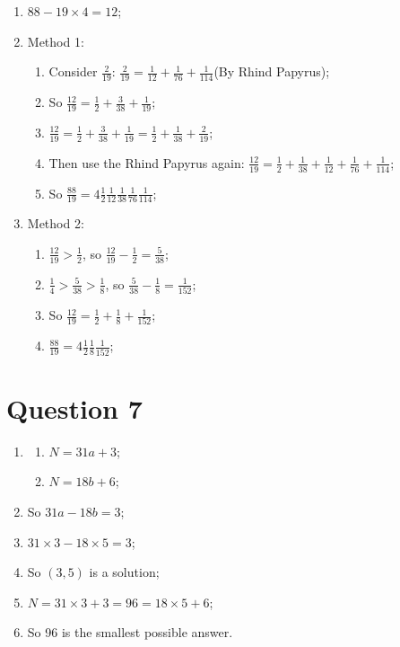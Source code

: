 \documentclass{article}
\begin{document}
\begin{enumerate}
    \item $88-19\times 4=12$;
    \item Method 1: \begin{enumerate}
        \item Consider $\frac{2}{19}$: $\frac{2}{19}=\frac{1}{12}+\frac{1}{76}+\frac{1}{114}$(By Rhind Papyrus);
\item So $\frac{12}{19}=\frac{1}{2}+\frac{3}{38}+\frac{1}{19}$;
\item $\frac{12}{19}=\frac{1}{2}+\frac{3}{38}+\frac{1}{19}= \frac{1}{2}+\frac{1}{38}+\frac{2}{19}$;
\item Then use the Rhind Papyrus again: $\frac{12}{19}=\frac{1}{2}+\frac{1}{38}+\frac{1}{12}+\frac{1}{76}+\frac{1}{114}$;
\item So $\frac{88}{19}=4\frac{1}{2}\frac{1}{12}\frac{1}{38}\frac{1}{76}\frac{1}{114}$;
    \end{enumerate}
    \item Method 2: \begin{enumerate}
        \item $\frac{12}{19}>\frac{1}{2}$, so $\frac{12}{19}-\frac{1}{2}=\frac{5}{38}$;
        \item $\frac{1}{4}>\frac{5}{38}>\frac{1}{8}$, so $\frac{5}{38}-\frac{1}{8}=\frac{1}{152}$;
        \item So $\frac{12}{19}=\frac{1}{2}+\frac{1}{8}+\frac{1}{152}$;
        \item $\frac{88}{19}=4\frac{1}{2}\frac{1}{8}\frac{1}{152}$;
    \end{enumerate}
\end{enumerate}

\newpage

\section*{Question 7}

\begin{enumerate}
    \item \begin{enumerate}
        \item $N=31a+3$;
        \item $N=18b+6$;
    \end{enumerate}
    \item So $31a-18b=3$;
    \item $31\times 3-18\times 5=3$;
    \item So $(3,5)$ is a solution;
    \item $N=31\times 3+3=96=18\times 5+6$;
    \item So 96 is the smallest possible answer.
\end{enumerate}
\end{document}
